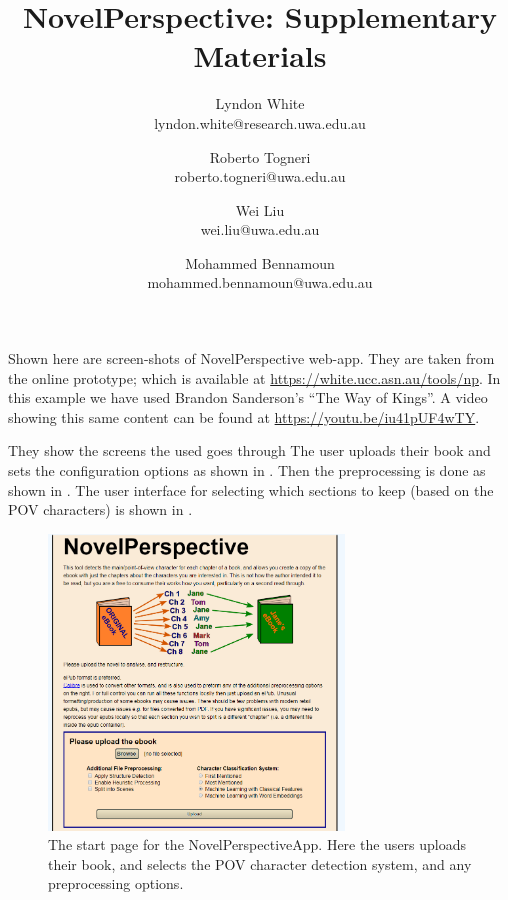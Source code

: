 \documentclass[11pt,a4paper]{article}
\title{NovelPerspective: Supplementary Materials}
\author{Lyndon White \\ lyndon.white@research.uwa.edu.au %
	\and Roberto Togneri \\ roberto.togneri@uwa.edu.au%
	\and Wei Liu \\ wei.liu@uwa.edu.au %
	\and Mohammed Bennamoun \\ mohammed.bennamoun@uwa.edu.au %
}
\begin{document}
\maketitle

Shown here are screen-shots of NovelPerspective web-app.
They are taken from the online prototype; which is available at \url{https://white.ucc.asn.au/tools/np}.
In this example we have used Brandon Sanderson's ``The Way of Kings''.
A video showing this same content can be found at \url{https://youtu.be/iu41pUF4wTY}.

They show the screens the used goes through
The user uploads their book and sets the configuration options as shown in .
Then the preprocessing is done as shown in .
The user interface for selecting which sections to keep (based on the POV characters)
is shown in .



\begin{figure}
	\centering
	\includegraphics[width=0.7\textwidth]{startpage}
	\caption{The start page for the NovelPerspectiveApp. Here the users uploads their book, and selects the POV character detection system, and any preprocessing options.}
	\label{fig:start}
\end{figure}
\end{document}
